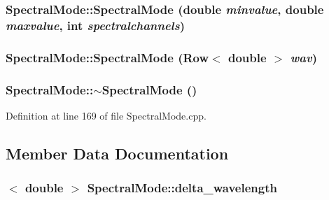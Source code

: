 \hypertarget{classSpectralMode_abafb61f9ba5c980bf5db7ebcad116d57}{
\subsubsection[{SpectralMode}]{\setlength{\rightskip}{0pt plus 5cm}SpectralMode::SpectralMode (double {\em minvalue}, \/  double {\em maxvalue}, \/  int {\em spectralchannels})}}
\label{classSpectralMode_abafb61f9ba5c980bf5db7ebcad116d57}
\hypertarget{classSpectralMode_a56d1476d403b85e1967948b5d6a77c71}{
\subsubsection[{SpectralMode}]{\setlength{\rightskip}{0pt plus 5cm}SpectralMode::SpectralMode ({\bf Row}$<$ double $>$ {\em wav})}}
\label{classSpectralMode_a56d1476d403b85e1967948b5d6a77c71}
\hypertarget{classSpectralMode_a8f6ff593021e7d0e175b528c94896a6b}{
\subsubsection[{$\sim$SpectralMode}]{\setlength{\rightskip}{0pt plus 5cm}SpectralMode::$\sim$SpectralMode ()}}
\label{classSpectralMode_a8f6ff593021e7d0e175b528c94896a6b}


Definition at line 169 of file SpectralMode.cpp.



\subsection{Member Data Documentation}
\hypertarget{classSpectralMode_af4835d0dd1c5276798e400f3bcfa1bb7}{
\subsubsection[{delta\_\-wavelength}]{$<$ double $>$ {\bf SpectralMode::delta\_\-wavelength}}}
\label{classSpectralMode_af4835d0dd1c5276798e400f3bcfa1bb7}


